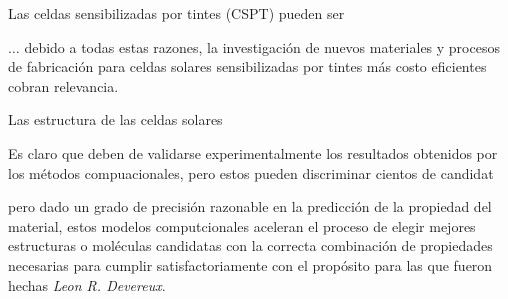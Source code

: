 Las celdas sensibilizadas por tintes (CSPT) pueden ser 

$\dots$ debido a todas estas razones, la investigación de nuevos materiales y procesos de fabricación para celdas solares sensibilizadas por tintes más costo eficientes cobran relevancia. 


Las estructura de las celdas solares 


Es claro que deben de validarse experimentalmente los resultados obtenidos por los métodos compuacionales, pero estos pueden discriminar cientos de candidat


pero dado un grado de precisión razonable  en la predicción de la propiedad del material, estos modelos computcionales aceleran el proceso de elegir mejores estructuras o moléculas candidatas con la correcta combinación de propiedades necesarias para cumplir satisfactoriamente con el propósito para las que fueron hechas \textit{Leon R. Devereux}. 



